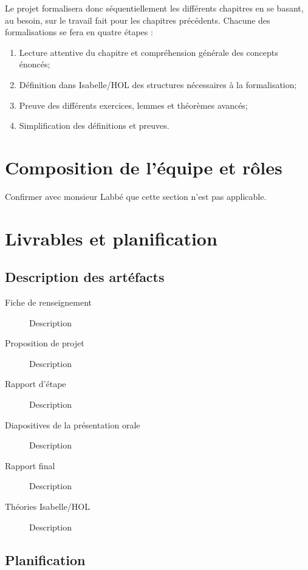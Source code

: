 \documentclass[a4paper, oneside, 12pt, titlepage, draft]{article}
\begin{document}
Le projet formalisera donc séquentiellement les différents chapitres en se basant, au besoin, sur le
travail fait pour les chapitres précédents. Chacune des formalisations se fera en quatre étapes :

\begin{enumerate}
  \item Lecture attentive du chapitre et compréhension générale des concepts énoncés;
  \item Définition dans Isabelle/HOL des structures nécessaires à la formalisation;
  \item Preuve des différents exercices, lemmes et théorèmes avancés;
  \item Simplification des définitions et preuves.
\end{enumerate}

\section{Composition de l'équipe et rôles}

Confirmer avec monsieur Labbé que cette section n'est pas applicable.

\section{Livrables et planification}

\subsection{Description des artéfacts}


\begin{description}
  \item[Fiche de renseignement] Description
  \item[Proposition de projet] Description
  \item[Rapport d'étape] Description
  \item[Diapositives de la présentation orale] Description
  \item[Rapport final] Description
  \item[Théories Isabelle/HOL] Description
\end{description}

\subsection{Planification}
\end{document}
